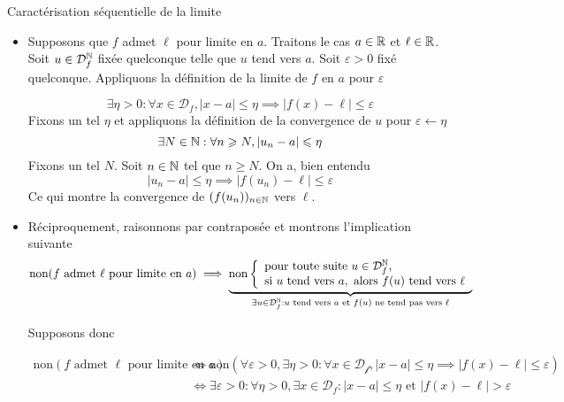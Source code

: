 \documentclass{article}
\renewenvironment{question_kholle}[2][ ]
{
	\subsection{\texorpdfstring{#2}{}}
	\notblank{#1}
	{
		\noindent #1
		\bigbreak
	}
	{}
	\begin{proof}
}
{
	\end{proof}
}
\begin{document}
\begin{question_kholle}{Caractérisation séquentielle de la limite}
  
\begin{itemize}[label=$\star$]
  \item Supposons que $f$ admet $\ell$ pour limite en $a$. Traitons le cas $a \in \mathbb R$ et $\ell \in \mathbb R$.
  Soit $u \in \mathcal{D}_{f}^{\mathbb N}$ fixée quelconque telle que $u$ tend vers $a$.
  Soit $\varepsilon>0$ fixé quelconque. Appliquons la définition de la limite de $f$ en $a$ pour $\varepsilon$

  $$
  \exists \eta >0 : \forall x \in \mathcal{D}_{f}, \lvert x - a \rvert \leqslant \eta \implies \lvert f(x) - \ell \rvert  \leqslant \varepsilon
  $$
  Fixons un tel $\eta$ et appliquons la définition de la convergence de $u$ pour $\varepsilon \leftarrow \eta$
  $$
  \exists N \in \mathbb N : \forall n \geqslant N, \lvert u_{n} - a \rvert  \leqslant \eta
  $$
  Fixons un tel $N$.
  Soit $n \in \mathbb N$ tel que $n \geqslant N$.
  On a, bien entendu
  $$
  \lvert u_{n} - a \rvert  \leqslant \eta \implies \lvert f(u_{n}) - \ell \rvert \leqslant \varepsilon
  $$
  Ce qui montre la convergence de $(f(u_{n}))_{n \in \mathbb N}$ vers $\ell$.

  \item Réciproquement, raisonnons par contraposée et montrons l'implication suivante
  $$
  \mathrm{non}(f \text{ admet }\ell \text{ pour limite en }a) \implies \underbrace{ \mathrm{non} \left\{ \begin{array}{ll}
    \text{pour toute suite } u \in \mathcal{D}_{f}^{\mathbb N}, \\
  \text{si } u \text{ tend vers } a, \text{ alors } f(u) \text{ tend vers } \ell
  \end{array}\right. }_{ \exists u \in \mathcal{D}_{f}^{\mathbb N} : u \text{ tend vers }a \text{ et } f(u) \text{ ne tend pas vers }\ell }
  $$

  Supposons donc 
  
  \begin{align}
  \mathrm{non}(f \text{ admet }\ell \text{ pour limite en }a)  &\iff \mathrm{non}(\forall \varepsilon>0, \exists \eta >0 : \forall x \in \mathcal{D_{f}}, \lvert x -a\rvert \leqslant \eta \implies \lvert f(x) - \ell \rvert\leqslant \varepsilon  ) \\
  &\iff \exists \varepsilon>0 : \forall \eta >0, \exists x \in \mathcal{D}_{f} : \lvert x-a \rvert \leqslant \eta \text{ et } \lvert f(x) - \ell \rvert  > \varepsilon \label{S13:Q2:1}
  \end{align}
  


\end{itemize}
\end{question_kholle}
\end{document}
